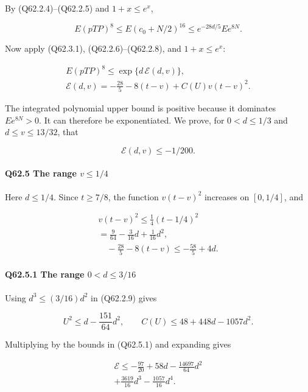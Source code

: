 By (Q62.2.4)--(Q62.2.5) and $1+x\le\allowbreak  e^x$,

\[
E(pTP)^8\le E(c_0+N/2)^{16}
\le e^{-28d/5}Ee^{8N}.
\]

Now apply (Q62.3.1), (Q62.2.6)--(Q62.2.8), and $1+x\le\allowbreak  e^x$:

\[
\boxed{\begin{gathered}
E(pTP)^8\le\exp\{d\,\mathcal E(d,v)\},\quad\\
\mathcal E(d,v)=-\frac{28}{5}-8(t-v)+C(U)v(t-v)^2.
\end{gathered}}\tag{Q62.4.1}\label{eq:Q62:Q62:4:1}
\]

The integrated polynomial upper bound is positive because it dominates $Ee^{8N}>\allowbreak 0$.
It can therefore be exponentiated.
We prove, for $0<\allowbreak d\le\allowbreak 1/3$ and $d\le\allowbreak  v\le\allowbreak 13/32$, that

\[
\mathcal E(d,v)\le-1/200.
\tag{Q62.4.2}\label{eq:Q62:Q62:4:2}
\]

\paragraph{Q62.5 The range $v\le\allowbreak 1/4$}

Here $d\le\allowbreak 1/4$. Since $t\ge\allowbreak 7/8$, the function $v(t-v)^2$ increases on $[0,\allowbreak  1/4]$, and

\[
\begin{gathered}
v(t-v)^2\le\frac14(t-1/4)^2\\
=\frac9{64}-\frac3{16}d+\frac1{16}d^2,\\
\quad -\frac{28}{5}-8(t-v)\le-\frac{58}{5}+4d.
\end{gathered}\tag{Q62.5.1}\label{eq:Q62:Q62:5:1}
\]

\paragraph{Q62.5.1 The range $0<\allowbreak d\le\allowbreak 3/16$}

Using $d^3\le\allowbreak (3/16)d^2$ in (Q62.2.9) gives

\[
U^2\le d-\frac{151}{64}d^2,
\qquad C(U)\le48+448d-1057d^2.
\]

Multiplying by the bounds in (Q62.5.1) and expanding gives

\[
\begin{gathered}
\mathcal E\le-\frac{97}{20}+58d-\frac{14697}{64}d^2\\
+\frac{3619}{16}d^3-\frac{1057}{16}d^4.
\end{gathered}
\]

